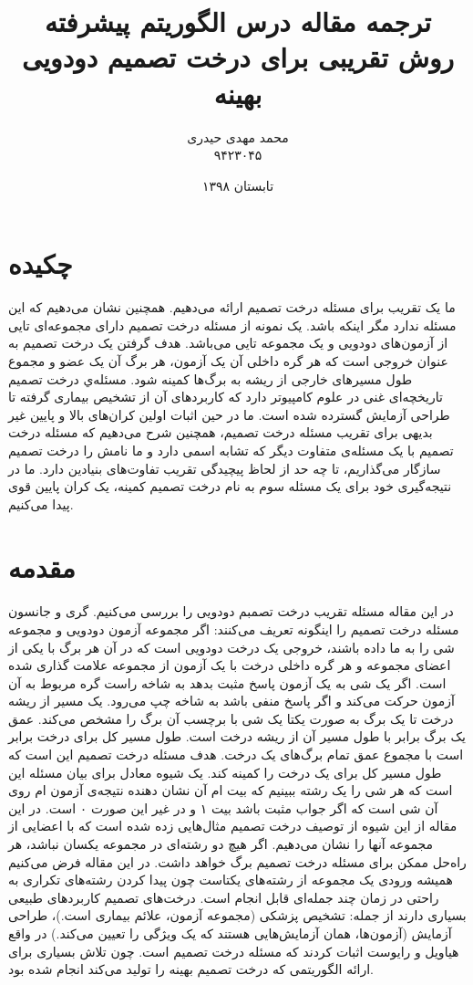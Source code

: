 \documentclass[a4paper]{article}
\title{ترجمه مقاله درس الگوریتم پیشرفته\\
روش تقریبی برای درخت تصمیم دودویی بهینه
}
\author{محمد مهدی حیدری\\۹۴۲۳۰۴۵}
\date{تابستان ۱۳۹۸}
\begin{document}
	\maketitle
	\section*{چکیده}
	ما یک تقریب
	برای مسئله درخت تصمیم ارائه می‌دهیم. همچنین نشان می‌دهیم که این مسئله
	ندارد مگر اینکه
	باشد. یک نمونه از مسئله درخت تصمیم دارای مجموعه‌ای
	تایی از آزمون‌های دودویی
	و یک مجموعه
	تایی 
	می‌باشد. هدف گرفتن یک درخت تصمیم به عنوان خروجی است که هر گره داخلی آن یک آزمون، هر برگ آن یک عضو و مجموع طول
	مسیرهای خارجی از ریشه به برگ‌ها کمینه شود. مسئله‌ي درخت تصمیم تاریخچه‌ای غنی در علوم کامپیوتر دارد که کاربردهای
	آن از تشخیص بیماری گرفته تا طراحی آزمایش گسترده شده است. ما در حین اثبات اولین کران‌های بالا و پایین غیر بدیهی 
	برای تقریب مسئله درخت تصمیم، همچنین شرح می‌دهیم که مسئله درخت تصمیم با یک مسئله‌ی متفاوت دیگر که تشابه اسمی دارد و ما نامش را درخت تصمیم سازگار می‌گذاریم، تا چه حد از لحاظ پیچیدگی تقریب تفاوت‌های بنیادین دارد. ما در نتیجه‌گیری خود برای یک مسئله سوم به نام درخت تصمیم کمینه، یک کران پایین قوی پیدا می‌کنیم.
	\section{مقدمه}
	\paragraph{}
	در این مقاله مسئله تقریب درخت تصمبم دودویی را بررسی می‌کنیم. گری و جانسون مسئله درخت تصمیم را اینگونه تعریف می‌کنند: اگر مجموعه
	آزمون دودویی 
	و مجموعه 
	شی 
	را به ما داده باشند، خروجی یک درخت دودویی است که در آن هر برگ با یکی از اعضای مجموعه 
	و هر گره داخلی درخت با یک آزمون از مجموعه 
	علامت گذاری شده است. اگر یک شی به یک آزمون پاسخ مثبت بدهد به شاخه
	راست گره مربوط به آن آزمون حرکت می‌کند و اگر پاسخ منفی باشد به شاخه چپ می‌رود. یک مسیر از ریشه درخت تا یک برگ 
	به صورت یکتا یک شی با برچسب آن برگ را مشخص می‌کند. عمق یک برگ برابر با طول مسیر آن از ریشه درخت است.
	طول مسیر کل برای درخت برابر است با مجموع عمق تمام برگ‌های یک درخت. هدف مسئله درخت تصمیم این است که طول مسیر کل
	برای یک درخت را کمینه کند. یک شیوه معادل برای بیان مسئله این است که هر شی را یک رشته 
	ببینیم که بیت 
	ام آن نشان دهنده نتیجه‌ی آزمون 
	ام روی آن شی است که اگر جواب مثبت باشد بیت ۱ و در غیر این صورت ۰ است. در این مقاله از این شیوه از توصیف درخت
	تصمیم مثال‌هایی زده شده است که با اعضایی از مجموعه
	آنها را نشان می‌دهیم.
	اگر هیچ دو رشته‌ای در مجموعه
	یکسان نباشد، هر راه‌حل ممکن برای مسئله درخت تصمیم
	برگ خواهد داشت. در این مقاله فرض می‌کنیم همیشه ورودی یک مجموعه از رشته‌های یکتاست چون پیدا کردن رشته‌های تکراری
	به راحتی در زمان چند جمله‌ای قابل انجام است. درخت‌های تصمیم کاربردهای طبیعی بسیاری دارند از جمله: تشخیص پزشکی
	(مجموعه آزمون، علائم بیماری است.)، طراحی آزمایش (آزمون‌ها، همان آزمایش‌هایی هستند که یک ویژگی را تعیین می‌کند.)
	در واقع هیاویل و رایوست اثبات کردند که مسئله درخت تصمیم 
	است. چون تلاش بسیاری برای ارائه الگوریتمی که درخت تصمیم بهینه را تولید می‌کند انجام شده بود.
\end{document}
